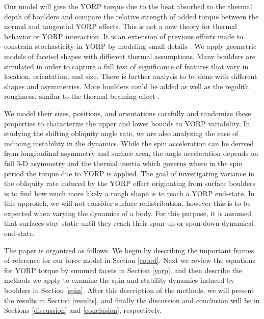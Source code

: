 \documentclass[12pt,notitlepage]{article}
\begin{document}
Our model will give the YORP torque due to the heat absorbed to the thermal depth of boulders and compare the relative strength of added torque between the normal and tangential YORP effects. This is not a new theory for thermal behavior or YORP interaction. It is an extension of previous efforts made to constrain stochasticity in YORP by modeling small details \cite{Statler2009} \cite{Rozitis2012}. We apply geometric models of faceted shapes with different thermal assumptions. Many boulders are simulated in order to capture a full test of significance of features that vary in location, orientation, and size. There is further analysis to be done with different shapes and asymmetries. More boulders could be added as well as the regolith roughness, similar to the thermal beaming effect \cite{Rozitis2011a}.  


We model their sizes, positions, and orientations carefully and randomize these properties to characterize the upper and lower bounds to YORP variability. In studying the shifting obliquity angle rate, we are also analyzing the ease of inducing instability in the dynamics. While the spin acceleration can be derived from longitudinal asymmetry and surface area, the angle acceleration depends on full 3-D asymmetry and the thermal inertia which governs where in the spin period the torque due to YORP is applied. The goal of investigating variance in the obliquity rate induced by the YORP effect originating from surface boulders is to find how much more likely a rough shape is to reach a YORP end-state. In this approach, we will not consider surface redistribution, however this is to be expected when varying the dynamics of a body. For this purpose, it is assumed that surfaces stay static until they reach their spun-up or spun-down dynamical end-state.  


The paper is organized as follows. We begin by describing the important frames of reference for our force model in Section \ref{coord}. Next we review the equations for YORP torque by summed facets in Section \ref{yorp}, and then describe the methods we apply to examine the spin and stability dynamics induced by boulders in Section \ref{spin}. After this description of the methods, we will present the results in Section \ref{results}, and finally the discussion and conclusion will be in Sections \ref{discussion} and \ref{conclusion}, respectively. 
\end{document}
